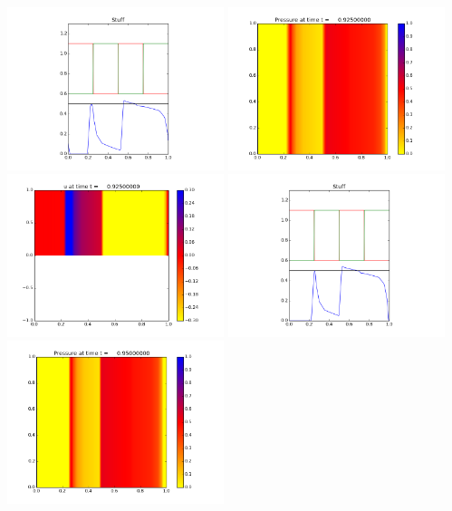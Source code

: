 \documentclass[11pt]{article}
\begin{document}
\vskip 10pt 
\includegraphics[width=0.475\textwidth]{frame0036fig3.png}
\vskip 10pt 
\includegraphics[width=0.475\textwidth]{frame0037fig0.png}
\includegraphics[width=0.475\textwidth]{frame0037fig1.png}
\vskip 10pt 
\includegraphics[width=0.475\textwidth]{frame0037fig3.png}
\vskip 10pt 
\includegraphics[width=0.475\textwidth]{frame0038fig0.png}
\end{document}
